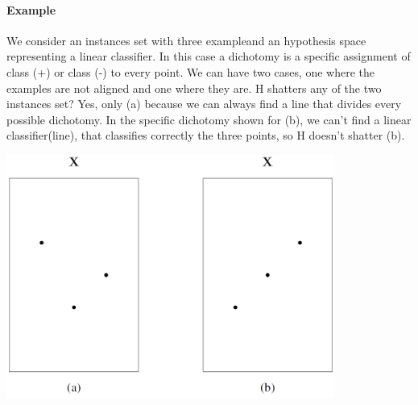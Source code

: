 \documentclass[main.tex]{subfiles}
\begin{document}
\paragraph{Example} We consider an instances set with three example\footnotemark and an hypothesis space representing a linear classifier. In this case a dichotomy is a specific assignment of class (+) or class (-) to every point. We can have two cases, one where the examples are not aligned and one where they are. H shatters any of the two instances set? Yes, only (a) because we can always find a line that divides every possible dichotomy. In the specific dichotomy shown for (b), we can't find a linear classifier(line), that classifies correctly the three points, so H doesn't shatter (b). 
\begin{center}
    \includegraphics[height=80mm]{img/VC_example.PNG}
\end{center}
\end{document}
